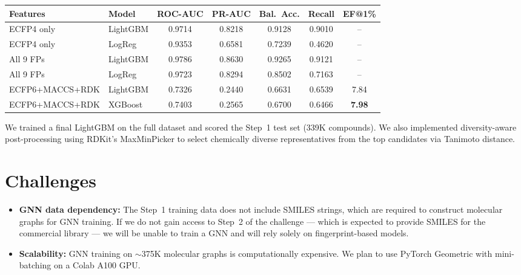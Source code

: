 \documentclass[11pt, letterpaper]{article}
\begin{document}
\vspace{6pt}
\begin{center}
\small
\begin{tabular}{llccccc}
\toprule
\textbf{Features} & \textbf{Model} & \textbf{ROC-AUC} & \textbf{PR-AUC} & \textbf{Bal.\ Acc.} & \textbf{Recall} & \textbf{EF@1\%} \\
\midrule
ECFP4 only      & LightGBM & 0.9714 & 0.8218 & 0.9128 & 0.9010 & -- \\
ECFP4 only      & LogReg   & 0.9353 & 0.6581 & 0.7239 & 0.4620 & -- \\
All 9 FPs       & LightGBM & 0.9786 & 0.8630 & 0.9265 & 0.9121 & -- \\
All 9 FPs       & LogReg   & 0.9723 & 0.8294 & 0.8502 & 0.7163 & -- \\
ECFP6+MACCS+RDK & LightGBM & 0.7326 & 0.2440 & 0.6631 & 0.6539 & 7.84 \\
ECFP6+MACCS+RDK & XGBoost  & 0.7403 & 0.2565 & 0.6700 & 0.6466 & \textbf{7.98} \\
\bottomrule
\end{tabular}
\end{center}
\vspace{6pt}

We trained a final LightGBM on the full dataset and scored the Step~1 test set (339K compounds). We also implemented diversity-aware post-processing using RDKit's MaxMinPicker to select chemically diverse representatives from the top candidates via Tanimoto distance.

\section*{Challenges}

\begin{itemize}[leftmargin=1.5em, itemsep=4pt, topsep=2pt]
    \item \textbf{GNN data dependency:} The Step~1 training data does not include SMILES strings, which are required to construct molecular graphs for GNN training. If we do not gain access to Step~2 of the challenge --- which is expected to provide SMILES for the commercial library --- we will be unable to train a GNN and will rely solely on fingerprint-based models.
    \item \textbf{Scalability:} GNN training on ${\sim}$375K molecular graphs is computationally expensive. We plan to use PyTorch Geometric with mini-batching on a Colab A100 GPU.
\end{itemize}
\end{document}
